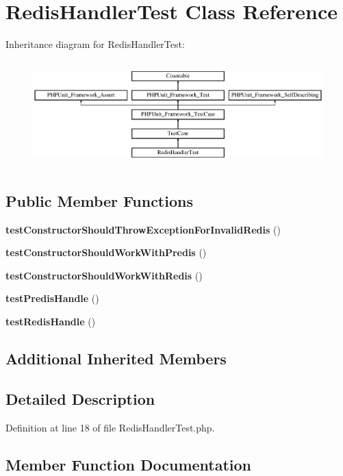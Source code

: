 \section{Redis\+Handler\+Test Class Reference}
\label{class_monolog_1_1_handler_1_1_redis_handler_test}
Inheritance diagram for Redis\+Handler\+Test\+:\begin{figure}[H]
\begin{center}
\leavevmode
\includegraphics[height=4.129793cm]{class_monolog_1_1_handler_1_1_redis_handler_test}
\end{center}
\end{figure}
\subsection*{Public Member Functions}
\begin{DoxyCompactItemize}
\item 
{\bf test\+Constructor\+Should\+Throw\+Exception\+For\+Invalid\+Redis} ()
\item 
{\bf test\+Constructor\+Should\+Work\+With\+Predis} ()
\item 
{\bf test\+Constructor\+Should\+Work\+With\+Redis} ()
\item 
{\bf test\+Predis\+Handle} ()
\item 
{\bf test\+Redis\+Handle} ()
\end{DoxyCompactItemize}
\subsection*{Additional Inherited Members}


\subsection{Detailed Description}


Definition at line 18 of file Redis\+Handler\+Test.\+php.



\subsection{Member Function Documentation}
